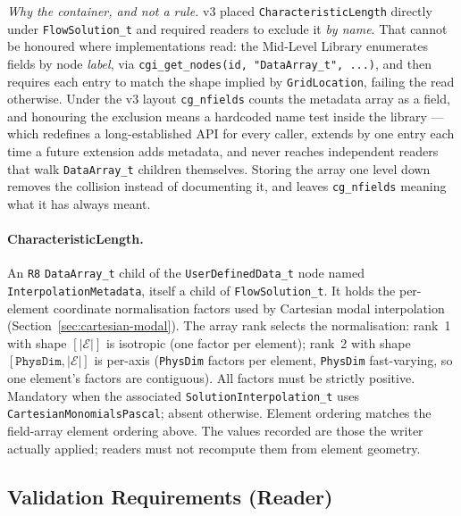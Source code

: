 \documentclass[11pt,letterpaper]{article}
\begin{document}
\smallskip
\noindent\textit{Why the container, and not a rule.}  v3 placed
\texttt{CharacteristicLength} directly under \texttt{FlowSolution\_t} and required
readers to exclude it \emph{by name}.  That cannot be honoured where
implementations read: the Mid-Level Library enumerates fields by node \emph{label},
via \texttt{cgi\_get\_nodes(id, "DataArray\_t", ...)}, and then requires each entry
to match the shape implied by \texttt{GridLocation}, failing the read otherwise.
Under the v3 layout \texttt{cg\_nfields} counts the metadata array as a field, and
honouring the exclusion means a hardcoded name test inside the library --- which
redefines a long-established API for every caller, extends by one entry each time a
future extension adds metadata, and never reaches independent readers that walk
\texttt{DataArray\_t} children themselves.  Storing the array one level down
removes the collision instead of documenting it, and leaves \texttt{cg\_nfields}
meaning what it has always meant.

\paragraph{CharacteristicLength.}
An \texttt{R8} \texttt{DataArray\_t} child of the
\texttt{UserDefinedData\_t} node named \texttt{Interpolation\-Metadata}, itself a
child of \texttt{FlowSolution\_t}.  It holds the per-element coordinate
normalisation factors used by Cartesian modal interpolation
(Section~\ref{sec:cartesian-modal}).  The array rank selects the
normalisation:
rank~1 with shape $[|\mathcal{E}|]$ is isotropic (one factor per element); rank~2 with
shape $[\texttt{PhysDim}, |\mathcal{E}|]$ is per-axis (\texttt{PhysDim} factors per
element, \texttt{PhysDim} fast-varying, so one element's factors are contiguous).  All
factors must be strictly positive.  Mandatory when the associated
\texttt{SolutionInterpolation\_t} uses \texttt{CartesianMonomialsPascal}; absent
otherwise.  Element ordering matches the field-array element ordering above.  The
values recorded are those the writer actually applied; readers must not recompute them
from element geometry.

\subsection{Validation Requirements (Reader)}
\label{sec:validation}
\end{document}
